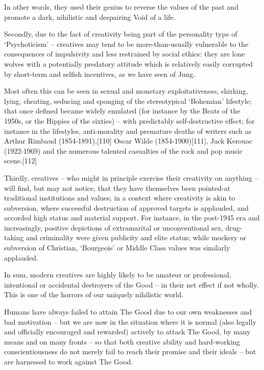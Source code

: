 \documentclass[
]{book}
\begin{document}
In other words, they used their genius to reverse the values of the past and promote a dark, nihilistic and despairing Void of a life.

Secondly, due to the fact of creativity being part of the personality type of `Psychoticism' -- creatives may tend to be more-than-usually vulnerable to the consequences of impulsivity and less restrained by social ethics: they are lone wolves with a potentially predatory attitude which is relatively easily corrupted by short-term and selfish incentives, as we have seen of Jung.

Most often this can be seen in sexual and monetary exploitativeness, shirking, lying, cheating, seducing and sponging of the stereotypical `Bohemian' lifestyle; that once defined became widely emulated (for instance by the Beats of the 1950s, or the Hippies of the sixties) -- with predictably self-destructive effect; for instance in the lifestyles, anti-morality and premature deaths of writers such as Arthur Rimbaud (1854-1891),{[}110{]} Oscar Wilde (1854-1900){[}111{]}, Jack Kerouac (1922-1969) and the numerous talented casualties of the rock and pop music scene.{[}112{]}

Thirdly, creatives -- who might in principle exercise their creativity on anything -- will find, but may not notice, that they have themselves been pointed-at traditional institutions and values; in a context where creativity is akin to subversion, where successful destruction of approved targets is applauded, and accorded high status and material support. For instance, in the post-1945 era and increasingly, positive depictions of extramarital or unconventional sex, drug-taking and criminality were given publicity and elite status; while mockery or subversion of Christian, `Bourgeois' or Middle Class values was similarly applauded.

In sum, modern creatives are highly likely to be amateur or professional, intentional or accidental destroyers of the Good -- in their net effect if not wholly. This is one of the horrors of our uniquely nihilistic world.

Humans have always failed to attain The Good due to our own weaknesses and bad motivation -- but we are now in the situation where it is normal (also legally and officially encouraged and rewarded) actively to attack The Good, by many means and on many fronts -- so that both creative ability and hard-working conscientiousness do not merely fail to reach their promise and their ideals -- but are harnessed to work against The Good.
\end{document}
